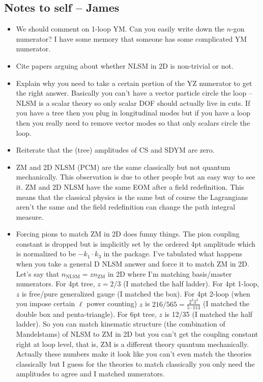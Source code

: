 \documentclass[11pt,letter]{article}
\begin{document}
\subsection{Notes to self -- James}
\begin{itemize}
\item We should comment on 1-loop YM.  Can you easily write down the $n$-gon numerator?  I have some memory that someone has some complicated YM numerator.
\item Cite papers arguing about whether NLSM in 2D is non-trivial or not.
\item Explain why you need to take a certain portion of the YZ numerator to get the right answer.  Basically you can't have a vector particle circle the loop -- NLSM is a scalar theory so only scalar DOF should actually live in cuts.  If you have a tree then you plug in longitudinal modes but if you have a loop then you really need to remove vector modes so that only scalars circle the loop.
\item Reiterate that the (tree) amplitudes of CS and SDYM are zero.
\item ZM and 2D NLSM (PCM) are the same classically but not quantum mechanically.
This observation is due to other people but an easy way to see it.
ZM and 2D NLSM have the same EOM after a field redefinition.
This means that the classical physics is the same but of course the Lagrangians aren't the same and the field redefinition can change the path integral measure.
\item Forcing pions to match ZM in 2D does funny things.
The pion coupling constant is dropped but is implicitly set by the ordered 4pt amplitude which is normalized to be $-k_1 \cdot k_3$ in the package.
I've tabulated what happens when you take a general D NLSM answer and force it to match ZM in 2D.
Let's say that $n_\text{NLSM} = z n_\text{ZM}$ in 2D where I'm matching basis/master numerators.
For 4pt tree, $z=2/3$ (I matched the half ladder).
For 4pt 1-loop, $z$ is free/pure generalized gauge (I matched the box).
For 4pt 2-loop (when you impose certain $\ell$ power counting) $z$ is $216/565=\tfrac{2^3 3^3}{5 \cdot 113}$ (I matched the double box and penta-triangle).
For 6pt tree, $z$ is 12/35 (I matched the half ladder).
So you can match kinematic structure (the combination of Mandelstams) of NLSM to ZM in 2D but you can't get the coupling constant right at loop level, that is, ZM is a different theory quantum mechanically.
Actually these numbers make it look like you can't even match the theories classically but I guess for the theories to match classically you only need the amplitudes to agree and I matched numerators.

\end{itemize}
\end{document}
